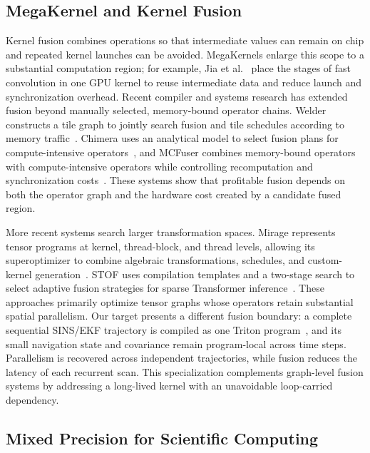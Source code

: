 \documentclass[research]{fcs}
\begin{document}
\subsection{MegaKernel and Kernel Fusion}
\label{subsec:related-fusion}

Kernel fusion combines operations so that intermediate values can remain on chip and repeated kernel launches can be avoided. MegaKernels enlarge this scope to a substantial computation region; for example, Jia et al.~\cite{jia2020megakernels} place the stages of fast convolution in one GPU kernel to reuse intermediate data and reduce launch and synchronization overhead. Recent compiler and systems research has extended fusion beyond manually selected, memory-bound operator chains. Welder constructs a tile graph to jointly search fusion and tile schedules according to memory traffic~\cite{shi2023welder}. Chimera uses an analytical model to select fusion plans for compute-intensive operators~\cite{zheng2023chimera}, and MCFuser combines memory-bound operators with compute-intensive operators while controlling recomputation and synchronization costs~\cite{zhang2024mcfuser}. These systems show that profitable fusion depends on both the operator graph and the hardware cost created by a candidate fused region.

More recent systems search larger transformation spaces. Mirage represents tensor programs at kernel, thread-block, and thread levels, allowing its superoptimizer to combine algebraic transformations, schedules, and custom-kernel generation~\cite{wu2025mirage}. STOF uses compilation templates and a two-stage search to select adaptive fusion strategies for sparse Transformer inference~\cite{dai2026stof}. These approaches primarily optimize tensor graphs whose operators retain substantial spatial parallelism. Our target presents a different fusion boundary: a complete sequential SINS/EKF trajectory is compiled as one Triton program~\cite{triton}, and its small navigation state and covariance remain program-local across time steps. Parallelism is recovered across independent trajectories, while fusion reduces the latency of each recurrent scan. This specialization complements graph-level fusion systems by addressing a long-lived kernel with an unavoidable loop-carried dependency.

\subsection{Mixed Precision for Scientific Computing}
\label{subsec:related-precision}
\end{document}
